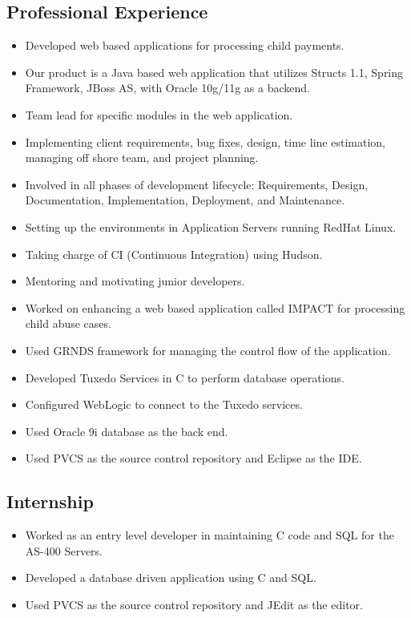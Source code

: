 \documentclass[11pt,letterpaper,sans]{moderncv} %
\begin{document}
  \subsection{Professional Experience}
     {\begin{itemize}
         \item Developed web based applications for processing child payments.
         \item Our product is a Java based web application that utilizes Structs 1.1, Spring Framework, JBoss AS, with Oracle 10g/11g as a backend.
         \item Team lead for specific modules in the web application.
         \item Implementing client requirements, bug fixes, design, time line estimation, managing off shore team, and project planning.
         \item Involved in all phases of development lifecycle: Requirements, Design, Documentation, Implementation, Deployment, and Maintenance.
         \item Setting up the environments in Application Servers running RedHat Linux.
         \item Taking charge of CI (Continuous Integration) using Hudson.
         \item Mentoring and motivating junior developers.
     \end{itemize}}
     
     {\begin{itemize}
         \item Worked on enhancing a web based application called IMPACT for processing child abuse cases.
         \item Used GRNDS framework for managing the control flow of the application.
         \item Developed Tuxedo Services in C to perform database operations.
         \item Configured WebLogic to connect to the Tuxedo services.
         \item Used Oracle 9i database as the back end.
         \item Used PVCS as the source control repository and Eclipse as the IDE.
     \end{itemize}}

  \subsection{Internship}
     {\begin{itemize}
         \item Worked as an entry level developer in maintaining C code and SQL for the AS-400 Servers.
         \item Developed a database driven application using C and SQL.
         \item Used PVCS as the source control repository and JEdit as the editor.
     \end{itemize}}
  
\end{document}
